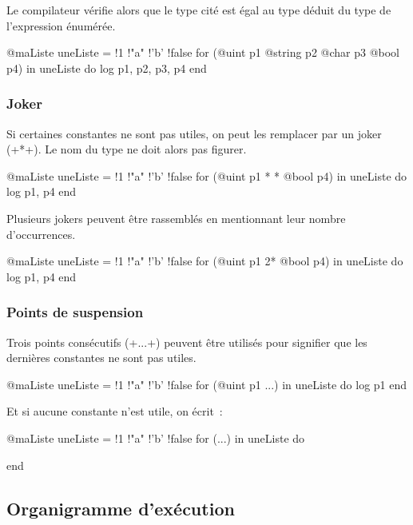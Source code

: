 Le compilateur vérifie alors que le type cité est égal au type déduit du type de l'expression énumérée.
\begin{galgas3}
@maListe uneListe = {!1 !"a" !'b' !false}
for (@uint p1 @string p2 @char p3 @bool p4) in uneListe do
  log p1, p2, p3, p4
end
\end{galgas3}


\subsubsection{Joker}

Si certaines constantes ne sont pas utiles, on peut les remplacer par un joker (\ggst+*+). Le nom du type ne doit alors pas figurer.
\begin{galgas3}
@maListe uneListe = {!1 !"a" !'b' !false}
for (@uint p1 * * @bool p4) in uneListe do
  log p1, p4
end
\end{galgas3}

Plusieurs jokers peuvent être rassemblés en mentionnant leur nombre d'occurrences.
\begin{galgas3}
@maListe uneListe = {!1 !"a" !'b' !false}
for (@uint p1 2* @bool p4) in uneListe do
  log p1, p4
end
\end{galgas3}



\subsubsection{Points de suspension}

Trois points consécutifs (\ggst+...+) peuvent être utilisés pour signifier que les dernières constantes ne sont pas utiles.

\begin{galgas3}
@maListe uneListe = {!1 !"a" !'b' !false}
for (@uint p1 ...) in uneListe do
  log p1
end
\end{galgas3}

Et si aucune constante n'est utile, on écrit~:
\begin{galgas3}
@maListe uneListe = {!1 !"a" !'b' !false}
for (...) in uneListe do

end
\end{galgas3}






\subsection{Organigramme d'exécution}

